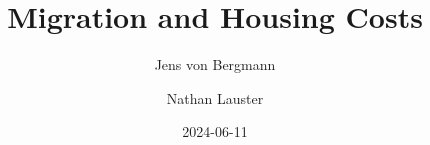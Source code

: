 \documentclass[
  letterpaper,
]{article}
\title{Migration and Housing Costs}
\author{Jens von Bergmann \and Nathan Lauster}
\date{2024-06-11}
\begin{document}


\begin{titlepage}

\pagecolor{mm_theme}

\newcommand{\titlepagepagealign}{
\ifthenelse{\equal{center}{right}}{\raggedleft}{}
\ifthenelse{\equal{center}{center}}{\centering}{}
\ifthenelse{\equal{center}{left}}{\raggedright}{}
}


\newcommand{\titleandsubtitle}{
{{\huge{\bfseries{\nohyphens{Migration and Housing Costs}}}}\par
}%
}
\newcommand{\titlepagetitleblock}{
\newcommand{\HRule}{\rule{\linewidth}{0.5mm}} 

\HRule\\[0.4cm]

\titleandsubtitle

\HRule\\
}
\newcommand{\authorstyle}[1]{{\textsc{#1}}}

\newcommand{\affiliationstyle}[1]{{\large{#1}}}

\newcommand{\titlepageauthorblock}{
\newlength{\miniA}
\setlength{\miniA}{0pt}
\newlength{\namelen}
\settowidth{\namelen}{Jens von
Bergmann}\setlength{\miniA}{\maxof{\miniA}{\namelen}}\settowidth{\namelen}{Nathan
Lauster}\setlength{\miniA}{\maxof{\miniA}{\namelen}}
\setlength{\miniA}{\miniA+0.05\textwidth}
\newlength{\miniB}
\setlength{\miniB}{0.99\textwidth - \miniA}
\begin{minipage}{\miniA}
\begin{flushleft}
{\authorstyle{Jens von Bergmann\\ Nathan Lauster}}
\end{flushleft}
\end{minipage}
\begin{minipage}{\miniB}
\begin{flushright}
{\affiliationstyle{MountainMath
\\
UBC Sociology
\\}}
\end{flushright}
\end{minipage}}

\newcommand{\titlepageaffiliationblock}{}
\newcommand{\headerstyled}{%
{\textsc{\LARGE{Mountain Doodles}}}
}
\newcommand{\footerstyled}{%
{}
}
\newcommand{\datestyled}{%
{\large{2024-06-11}}
}


\newcommand{\titlepageheaderblock}{\headerstyled}


\end{titlepage}
\end{document}
